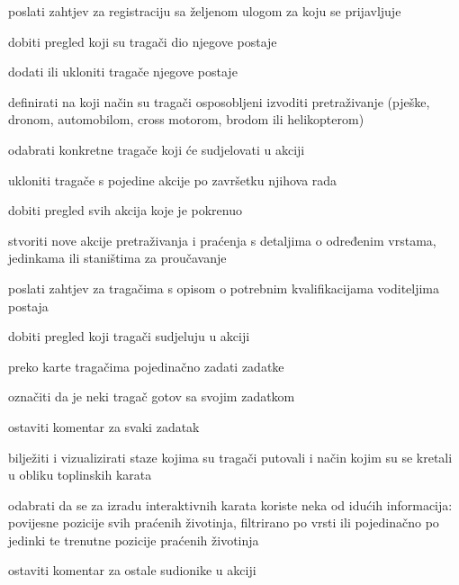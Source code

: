 			
			\begin{packed_enum}
				\item  {}
				
				\begin{packed_enum}
					
					\item poslati zahtjev za registraciju sa željenom ulogom za koju se prijavljuje
					
				\end{packed_enum}
				
			
				\item  {}
				
				\begin{packed_enum}
					
					\item dobiti pregled koji su tragači dio njegove postaje					
					\item dodati ili ukloniti tragače njegove postaje
					\item definirati na koji način su tragači osposobljeni izvoditi pretraživanje (pješke, dronom, automobilom, cross motorom, brodom ili helikopterom)
					\item odabrati konkretne tragače koji će sudjelovati u akciji
					\item ukloniti tragače s pojedine akcije po završetku njihova rada
					
				\end{packed_enum}
				
				\item  {}
				
				\begin{packed_enum}
					
					\item dobiti pregled svih akcija koje je pokrenuo
					\item stvoriti nove akcije pretraživanja i praćenja s detaljima o određenim vrstama, jedinkama ili staništima za proučavanje
					\item poslati zahtjev za tragačima s opisom o potrebnim kvalifikacijama voditeljima postaja
					\item dobiti pregled koji tragači sudjeluju u akciji					
					\item preko karte tragačima pojedinačno zadati zadatke
					\item označiti da je neki tragač gotov sa svojim zadatkom
					\item ostaviti komentar za svaki zadatak
					\item bilježiti i vizualizirati staze kojima su tragači putovali i način kojim su se kretali u obliku toplinskih karata  
					\item odabrati da se za izradu interaktivnih karata koriste neka od idućih informacija: povijesne pozicije svih praćenih životinja, filtrirano po vrsti ili pojedinačno po jedinki te trenutne pozicije praćenih životinja 
					\item ostaviti komentar za ostale sudionike u akciji  
					

\end{packed_enum}
\end{packed_enum}
